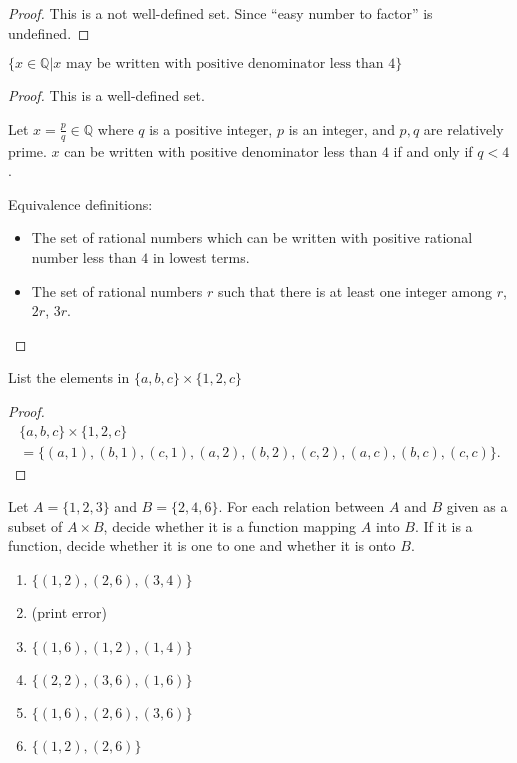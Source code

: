 \begin{proof}
    This is a not well-defined set. Since ``easy number to factor'' is undefined.
\end{proof}

\begin{exercise}
    $\{ x\in\mathbb{Q} \vert \text{$x$ may be written with positive denominator less than $4$} \}$
\end{exercise}

\begin{proof}
    This is a well-defined set.

    Let $x = \frac{p}{q}\in\mathbb{Q}$ where $q$ is a positive integer, $p$ is an integer, and $p, q$ are relatively prime. $x$ can be written with positive denominator less than $4$ if and only if $q < 4$.

    Equivalence definitions:
    \begin{itemize}
        \item The set of rational numbers which can be written with positive rational number less than $4$ in lowest terms.
        \item The set of rational numbers $r$ such that there is at least one integer among $r$, $2r$, $3r$.
    \end{itemize}
\end{proof}

\begin{exercise}
    List the elements in $\{ a, b, c \} \times \{ 1, 2, c \}$
\end{exercise}

\begin{proof}
    \begin{multline*}
        \{ a, b, c \} \times \{ 1, 2, c \} \\
        = \{ (a, 1), (b, 1), (c, 1), (a, 2), (b, 2), (c, 2), (a, c), (b, c), (c, c) \}.
    \end{multline*}
\end{proof}

\begin{exercise}
    Let $A = \{ 1, 2, 3 \}$ and $B = \{ 2, 4, 6 \}$. For each relation between $A$ and $B$ given as a subset of $A\times B$, decide whether it is a function mapping $A$ into $B$. If it is a function, decide whether it is one to one and whether it is onto $B$.
    \begin{enumerate}[label={\textbf{\alph*.}},itemsep=0pt]
        \item $\{ (1, 2), (2, 6), (3, 4) \}$
        \item (print error)
        \item $\{ (1, 6), (1, 2), (1, 4) \}$
        \item $\{ (2, 2), (3, 6), (1, 6) \}$
        \item $\{ (1, 6), (2, 6), (3, 6) \}$
        \item $\{ (1, 2), (2, 6) \}$
    \end{enumerate}
\end{exercise}

